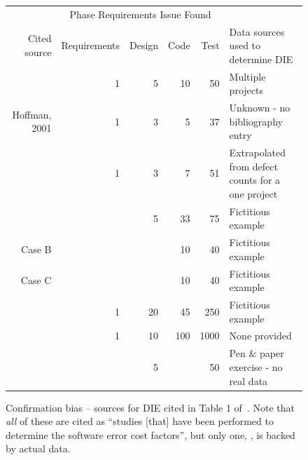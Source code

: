 \documentclass[smallcondensed]{svjour3}
\begin{document}
 \begin{figure}[!ht] 
{\small
\begin{center}
\begin{tabular}{r|rrrr|l}
                        & \multicolumn{4}{c}{Phase Requirements Issue Found }   &     \\
 Cited source           & Requirements  &   Design  &   Code    &  Test         & Data sources used to determine DIE          \\\hline
\cite{Boehm81}          &   1           &   5       &   10      &   50          & Multiple projects     \\  
Hoffman, 2001           &   1           &   3       &   5       &   37          & Unknown - no bibliography entry \\ 
\cite{Cigital2003}      &   1           &   3       &   7       &   51          & Extrapolated from defect counts for a one project \\
\cite{Rothman2000}      &               &   5       &   33      &   75          & Fictitious example \\
\cite{Rothman2000} Case B   &               &           &   10      &   40      & Fictitious example \\
\cite{Rothman2000} Case C   &               &           &   10      &   40      & Fictitious example \\
\cite{Rothman2002}      &   1           &   20      &   45      &   250         & Fictitious example \\
\cite{Pavlina2000}      &   1           &   10      &   100     &   1000        & None provided \\
\cite{McGibbon2007}     &               &   5       &           &   50          & Pen \& paper exercise - no real data \\
\end{tabular}
\end{center}}
\caption{Confirmation bias -- sources for DIE cited in Table 1 of~\cite{steck04}. Note that \textit{all} of these are cited as ``studies [that] have been performed to determine the software error cost factors'', but only one, \cite{Boehm81}, is backed by actual data.}\label{fig:steck}
\end{figure}




\end{document}
